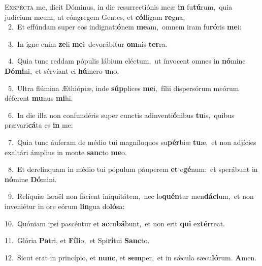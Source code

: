 \lettrine{\initial\textcolor{\initialcolor}{E}}{xspécta} me, dicit Dóminus, in die resurrectiónis meæ \textbf{in} fu\-\textbf{tú}\-rum,~\star quia judícium meum, ut cóngregem Gentes, et \textbf{cól}\-ligam \textbf{re}\-gna,\\
{\numbfont\textcolor{\numbcolor}{~2.}}~Et effúndam super eos indignati\-\textbf{ó}\-nem \textbf{me}\-am,~\star omnem iram fu\-\textbf{ró}\-ris \textbf{me}\-i:\par
{\numbfont\textcolor{\numbcolor}{~3.}}~In igne enim \textbf{ze}\-li \textbf{me}\-i~\star devorábitur \textbf{om}\-nis \textbf{ter}\-ra.\par
{\numbfont\textcolor{\numbcolor}{~4.}}~Quia tunc reddam pópulis lábium eléctum,~\dagger ut ínvocent omnes in \textbf{nó}\-mine \textbf{Dó}\-\textbf{mi}ni,~\star et sérviant ei \textbf{hú}\-mero \textbf{u}\-no.\par
{\numbfont\textcolor{\numbcolor}{~5.}}~Ultra flúmina Æthiópiæ, inde \textbf{súp}\-plices \textbf{me}\-i,~\star fílii dispersórum meórum déferent \textbf{mu}\-nus \textbf{mi}\-hi.\par
{\numbfont\textcolor{\numbcolor}{~6.}}~In die illa non confundéris super cunctis adinventi\-\textbf{ó}\-nibus \textbf{tu}\-is,~\star quibus prævari\-\textbf{cá}\-ta es \textbf{in} me:\par
{\numbfont\textcolor{\numbcolor}{~7.}}~Quia tunc áuferam de médio tui magníloquos su\-\textbf{pér}\-biæ \textbf{tu}\-æ,~\star et non adjícies exaltári ámplius in monte \textbf{sanc}\-to \textbf{me}\-o.\par
{\numbfont\textcolor{\numbcolor}{~8.}}~Et derelínquam in médio tui pópulum páuperem \textbf{et} e\-\textbf{gé}\-num:~\star et sperábunt in \textbf{nó}\-mine \textbf{Dó}\-mini.\par
{\numbfont\textcolor{\numbcolor}{~9.}}~Relíquiæ Israël non fácient iniquitátem,~\dagger nec lo\-\textbf{quén}\-tur men\-\textbf{dá}\-\textbf{ci}um,~\star et non inveniétur in ore eórum \textbf{lin}\-gua do\-\textbf{ló}\-sa:\par
{\numbfont\textcolor{\numbcolor}{10.}}~Quóniam ipsi pascéntur et \textbf{ac}\-cu\-\textbf{bá}\-bunt,~\star et non erit \textbf{qui} ex\-\textbf{tér}\-reat.\par
{\numbfont\textcolor{\numbcolor}{11.}}~Glória \textbf{Pa}\-tri, et \textbf{Fí}\-\textbf{li}o,~\star et Spi\-\textbf{rí}\-tui \textbf{Sanc}\-to.\par
{\numbfont\textcolor{\numbcolor}{12.}}~Sicut erat in princípio, et \textbf{nunc}\-, et \textbf{sem}\-per,~\star et in sǽcula sæcu\-\textbf{ló}\-rum. \textbf{A}\-men.\par
